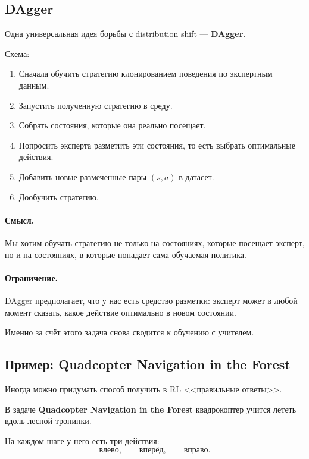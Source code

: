 \documentclass[12pt,a4paper]{article}
\begin{document}
\subsection{DAgger}

Одна универсальная идея борьбы с distribution shift --- \textbf{DAgger}.

Схема:

\begin{enumerate}
    \item Сначала обучить стратегию клонированием поведения по экспертным данным.
    \item Запустить полученную стратегию в среду.
    \item Собрать состояния, которые она реально посещает.
    \item Попросить эксперта разметить эти состояния, то есть выбрать оптимальные действия.
    \item Добавить новые размеченные пары $(s,a)$ в датасет.
    \item Дообучить стратегию.
\end{enumerate}

\paragraph{Смысл.}

Мы хотим обучать стратегию не только на состояниях, которые посещает эксперт, но и на состояниях, в которые попадает сама обучаемая политика.

\paragraph{Ограничение.}

DAgger предполагает, что у нас есть средство разметки: эксперт может в любой момент сказать, какое действие оптимально в новом состоянии.

Именно за счёт этого задача снова сводится к обучению с учителем.

\subsection{Пример: Quadcopter Navigation in the Forest}

Иногда можно придумать способ получить в RL <<правильные ответы>>.

В задаче \textbf{Quadcopter Navigation in the Forest} квадрокоптер учится лететь вдоль лесной тропинки.

На каждом шаге у него есть три действия:
\[
\text{влево},
\qquad
\text{вперёд},
\qquad
\text{вправо}.
\]
\end{document}
